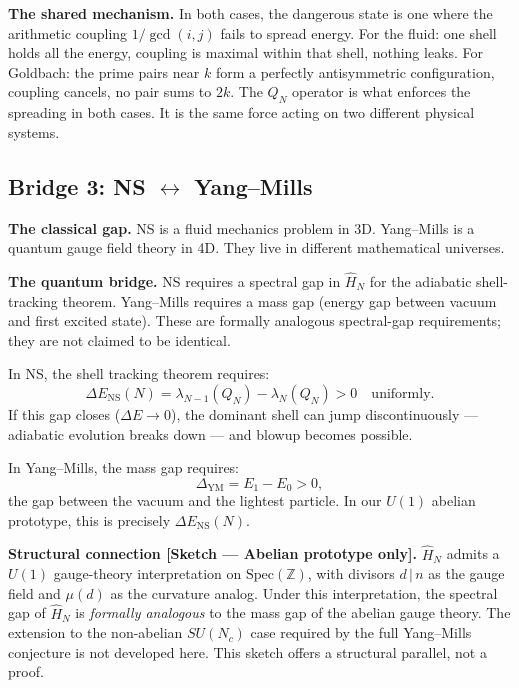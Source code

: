 \documentclass[12pt]{article}
\begin{document}
\textbf{The shared mechanism.}
In both cases, the dangerous state is one where the
arithmetic coupling $1/\gcd(i,j)$ fails to spread energy.
For the fluid: one shell holds all the energy, coupling is maximal
within that shell, nothing leaks.
For Goldbach: the prime pairs near $k$ form a perfectly
antisymmetric configuration, coupling cancels, no pair sums to $2k$.
The $Q_N$ operator is what enforces the spreading in both cases.
It is the same force acting on two different physical systems.

\subsection{Bridge 3: NS $\longleftrightarrow$ Yang--Mills}
\label{sec:bridge-ym}

\textbf{The classical gap.}
NS is a fluid mechanics problem in 3D.
Yang--Mills is a quantum gauge field theory in 4D.
They live in different mathematical universes.

\textbf{The quantum bridge.}
NS requires a spectral gap in $\hat{H}_N$ for the adiabatic shell-tracking theorem.
Yang--Mills requires a mass gap (energy gap between vacuum and first excited state).
These are formally analogous spectral-gap requirements; they are not claimed to be identical.

\medskip
In NS, the shell tracking theorem requires:
\[
  \Delta E_{\mathrm{NS}}(N)
  = \lambda_{N-1}(Q_N) - \lambda_N(Q_N) > 0 \quad\text{uniformly.}
\]
If this gap closes ($\Delta E \to 0$), the dominant shell can jump
discontinuously --- adiabatic evolution breaks down --- and blowup
becomes possible.

In Yang--Mills, the mass gap requires:
\[
  \Delta_{\mathrm{YM}} = E_1 - E_0 > 0,
\]
the gap between the vacuum and the lightest particle.
In our $U(1)$ abelian prototype, this is precisely $\Delta E_{\mathrm{NS}}(N)$.

\begin{tcolorbox}[keybox]
\textbf{Structural connection [Sketch --- Abelian prototype only].}
$\hat{H}_N$ admits a $U(1)$ gauge-theory interpretation on $\mathrm{Spec}(\mathbb{Z})$,
with divisors $d\,|\,n$ as the gauge field and $\mu(d)$ as the curvature analog.
Under this interpretation, the spectral gap of $\hat{H}_N$ is
\emph{formally analogous} to the mass gap of the abelian gauge theory.
The extension to the non-abelian $SU(N_c)$ case required by the full
Yang--Mills conjecture is not developed here.
This sketch offers a structural parallel, not a proof.
\end{tcolorbox}
\end{document}
